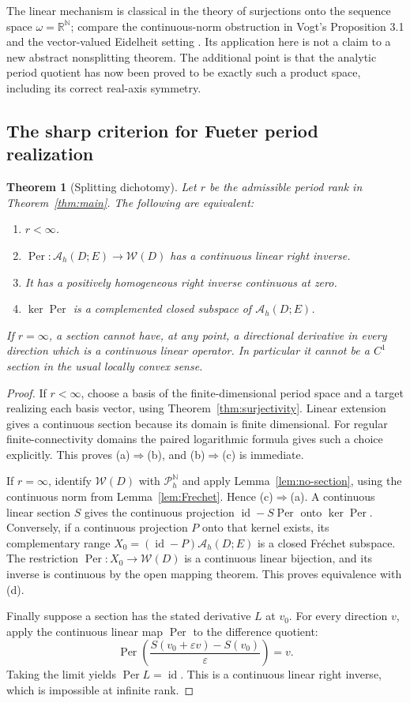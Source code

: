 \documentclass[11pt,a4paper]{article}
\numberwithin{equation}{section}
\newtheorem{theorem}{Theorem}[section]
\theoremstyle{definition}
\theoremstyle{remark}
\newcommand{\R}{\mathbb R}
\newcommand{\N}{\mathbb N}
\newcommand{\A}{\mathcal A_h}
\newcommand{\Pspace}{\mathscr P_h}
\newcommand{\Per}{\operatorname{Per}}
\newcommand{\calW}{\mathscr W}
\newcommand{\id}{\operatorname{id}}
\begin{document}
The linear mechanism is classical in the theory of surjections onto the
sequence space $\omega=\R^\N$; compare the continuous-norm obstruction in
Vogt's Proposition 3.1 \cite{vogt} and the vector-valued Eidelheit setting
\cite{debrouwere}. Its application here is not a claim to a new abstract
nonsplitting theorem. The additional point is that the analytic period
quotient has now been proved to be exactly such a product space, including
its correct real-axis symmetry.

\subsection{The sharp criterion for Fueter period realization}

\begin{theorem}[Splitting dichotomy]\label{thm:split}
Let $r$ be the admissible period rank in Theorem~\ref{thm:main}. The following
are equivalent:
\begin{enumerate}[label=\textup{(\alph*)},leftmargin=2em,itemsep=2pt]
\item $r<\infty$.
\item $\Per:\A(D;E)\to\calW(D)$ has a continuous linear right inverse.
\item It has a positively homogeneous right inverse continuous at zero.
\item $\ker\Per$ is a complemented closed subspace of $\A(D;E)$.
\end{enumerate}
If $r=\infty$, a section cannot have, at any point, a directional derivative
in every direction which is a continuous linear operator. In particular it
cannot be a $C^1$ section in the usual locally convex sense.
\end{theorem}
\begin{proof}
If $r<\infty$, choose a basis of the finite-dimensional period space and a
target realizing each basis vector, using Theorem~\ref{thm:surjectivity}.
Linear extension gives a continuous section because its domain is finite
dimensional. For regular finite-connectivity domains the paired logarithmic
formula gives such a choice explicitly. This proves (a)$\Rightarrow$(b),
and (b)$\Rightarrow$(c) is immediate.

If $r=\infty$, identify $\calW(D)$ with $\Pspace^\N$ and apply
Lemma~\ref{lem:no-section}, using the continuous norm from
Lemma~\ref{lem:Frechet}. Hence (c)$\Rightarrow$(a).
A continuous linear section $S$ gives the continuous projection
$\id-S\Per$ onto $\ker\Per$. Conversely, if a continuous projection $P$
onto that kernel exists, its complementary range $X_0=(\id-P)\A(D;E)$ is a
closed Fr\'echet subspace. The restriction $\Per:X_0\to\calW(D)$ is a
continuous linear bijection, and its inverse is continuous by the open
mapping theorem. This proves equivalence with (d).

Finally suppose a section has the stated derivative $L$ at $v_0$. For every
direction $v$, apply the continuous linear map $\Per$ to the difference
quotient:
\[
 \Per\!\left(\frac{S(v_0+\varepsilon v)-S(v_0)}{\varepsilon}\right)=v.
\]
Taking the limit yields $\Per L=\id$. This is a continuous linear right
inverse, which is impossible at infinite rank.
\end{proof}
\end{document}
